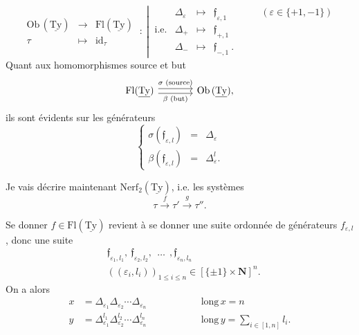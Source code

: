 \documentclass[11pt]{article}
\newcommand{\msp}[1]{\marginpar{\vspace*{10pt}\footnotesize [#1]}}
\newcommand{\uTy}{\underline{\mathrm{Ty}}}
\begin{document}
\[
\begin{array}{ccc}
\mathrm{Ob}\,(\uTy) & \longrightarrow & \mathrm{Fl}(\uTy)\\[4pt]
\tau & \longmapsto & \mathrm{id}_\tau
\end{array}
\ :\
\left|\
\begin{array}{rcccl}
 & \Delta_\varepsilon & \longmapsto & \mathfrak{f}_{\varepsilon,1} & \qquad(\varepsilon\in\{+1,-1\})\\[4pt]
\text{i.e.} & \Delta_+ & \longmapsto & \mathfrak{f}_{+,1} & \\[4pt]
 & \Delta_- & \longmapsto & \mathfrak{f}_{-,1}\ . &
\end{array}
\right.
\]
Quant aux homomorphismes source et but
\[
\begin{tikzcd}[column sep=large]
\mathrm{Fl}(\uTy) \arrow[r, shift left, "\sigma\text{ (source)}"] \arrow[r, shift right, "\beta\text{ (but)}"'] & \mathrm{Ob}\,(\uTy),
\end{tikzcd}
\]
ils sont évidents sur les générateurs
\[
\left\{
\begin{array}{lcl}
\sigma(\mathfrak{f}_{\varepsilon,l}) & = & \Delta_\varepsilon\\[4pt]
\beta(\mathfrak{f}_{\varepsilon,l}) & = & \Delta^l_\varepsilon.
\end{array}
\right.
\]

Je vais décrire maintenant $\mathrm{Nerf}_2(\uTy)$, i.e. les systèmes
\[
\tau \xrightarrow{\ f\ } \tau' \xrightarrow{\ g\ } \tau''.
\]

\msp{page 52}
Se donner $f\in\mathrm{Fl}(\uTy)$ revient à se donner une suite ordonnée de générateurs $f_{\varepsilon,l}$, donc une suite
\[
\begin{aligned}
&\mathfrak{f}_{\varepsilon_1,l_1},\ \mathfrak{f}_{\varepsilon_2,l_2},\ \ \dots\ \ ,\mathfrak{f}_{\varepsilon_n,l_n}\\
&((\varepsilon_i,l_i))_{1\leq i\leq n}\in[\{\pm1\}\times\mathbf{N}]^n.
\end{aligned}
\]
On a alors
\[
\begin{aligned}
x &= \Delta_{\varepsilon_1}\Delta_{\varepsilon_2}\cdots\Delta_{\varepsilon_n} &\qquad\qquad& \mathrm{long}\,x = n\\
y &= \Delta^{l_1}_{\varepsilon_1}\Delta^{l_2}_{\varepsilon_2}\cdots\Delta^{l_n}_{\varepsilon_n} && \mathrm{long}\,y = \textstyle\sum_{i\in[1,n]} l_i.
\end{aligned}
\]
\end{document}

